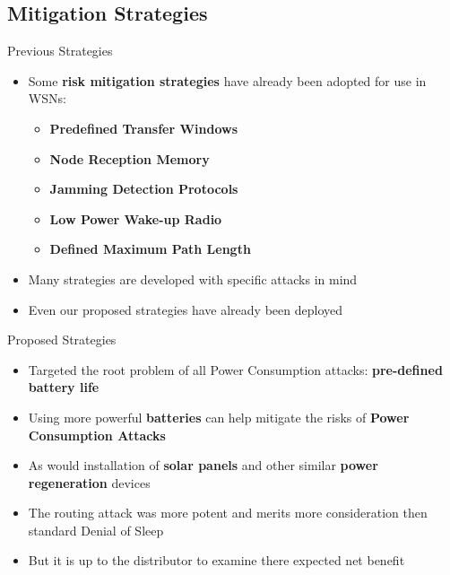 \documentclass{beamer}
\begin{document}
\subsection{Mitigation Strategies}

\begin{frame}{Previous Strategies}

\begin{itemize}

	\item Some \textbf{risk mitigation strategies} have already been adopted for use in WSNs:
	\begin{itemize}
		\item \textbf{Predefined Transfer Windows}
		\item \textbf{Node Reception Memory}
		\item \textbf{Jamming Detection Protocols}
		\item \textbf{Low Power Wake-up Radio}
		\item \textbf{Defined Maximum Path Length}
	\end{itemize}
	\item Many strategies are developed with specific attacks in mind
	\item Even our proposed strategies have already been deployed
	
\end{itemize}

\end{frame}

\begin{frame}{Proposed Strategies}

\begin{itemize}
	
	\item Targeted the root problem of all Power Consumption attacks: \textbf{pre-defined battery life}
	\item Using more powerful \textbf{batteries} can help mitigate the risks of \textbf{Power Consumption Attacks}
	\item As would installation of \textbf{solar panels} and other similar \textbf{power regeneration} devices
	\item The routing attack was more potent and merits more consideration then standard Denial of Sleep
	\item But it is up to the distributor to examine there expected net benefit
	
\end{itemize}

\end{frame}
\end{document}
